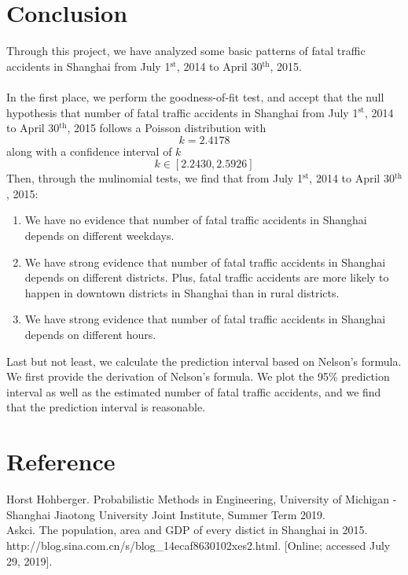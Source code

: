 \documentclass[a4paper,12pt]{article}
\begin{document}
\section{Conclusion}
\noindent Through this project, we have analyzed some basic patterns of fatal traffic accidents in Shanghai from July 1$^{\text{st}}$, 2014 to April 30$^{\text{th}}$, 2015. \\\\
In the first place, we perform the goodness-of-fit test, and accept that the null hypothesis that number of fatal traffic accidents in Shanghai from July 1$^{\text{st}}$, 2014 to April 30$^{\text{th}}$, 2015 follows a Poisson distribution with $$k=2.4178$$
 along with a confidence interval of $k$
 $$k\in[2.2430,2.5926]$$
Then, through the mulinomial tests, we find that from July 1$^{\text{st}}$, 2014 to April 30$^{\text{th}}$, 2015:
\begin{enumerate}
    \item We have no evidence that number of fatal traffic accidents in Shanghai depends on different weekdays. 
\item We have strong evidence that number of fatal traffic accidents in Shanghai depends on different districts. Plus,  fatal traffic accidents are more likely to happen in downtown districts in Shanghai than in rural districts.
\item We have strong evidence that number of fatal traffic accidents in Shanghai depends on different hours.
\end{enumerate}

\noindent Last but not least, we calculate the prediction interval based on Nelson's formula. We first provide the derivation of Nelson's formula. We plot the 95\% prediction interval as well as the estimated number of fatal traffic accidents, and we find that the prediction interval is reasonable.

\newpage
\section{Reference}
\noindent [1] Horst Hohberger. Probabilistic Methods in Engineering, University of Michigan \phantom{[1] }- Shanghai Jiaotong University
Joint Institute, Summer Term 2019.\\


\noindent
[2] Askci. The population, area and GDP of every distict in Shanghai in 2015. \phantom{[1] }http://blog.sina.com.cn/s/blog\_14ecaf8630102xes2.html. [Online; accessed July \phantom{[1] }29, 2019].\\
\end{document}
